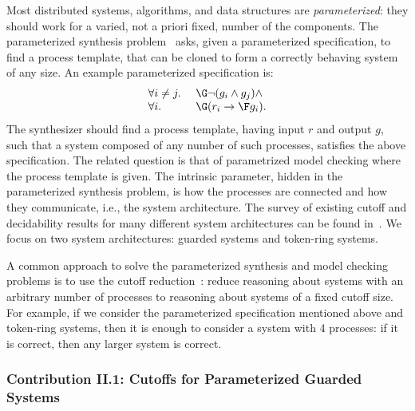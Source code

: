 Most distributed systems, algorithms, and data structures are \emph{parameterized}:
they should work for a varied, not a priori fixed, number of the components.
The parameterized synthesis problem~\cite{JB14} asks, given
a parameterized specification, to find a process template,
that can be cloned to form a correctly behaving system of any size.
An example parameterized specification is:
\[ \begin{array}{ll}
  \forall i \neq j.~ & \G \neg ( g_i \land g_j ) \land \\
  \forall i.~ & \G (r_i \impl \F g_i).
  \end{array}
\]
The synthesizer should find a process template, having input $r$ and output $g$,
such that a system composed of any number of such processes,
satisfies the above specification.
The related question is that of parametrized model checking
where the process template is given.
The intrinsic parameter,
hidden in the parameterized synthesis problem,
is how the processes are connected and how they communicate,
i.e., the system architecture.
The survey of existing cutoff and decidability results
for many different system architectures can be found in~\cite{BloemETAL15}.
We focus on two system architectures: guarded systems and token-ring systems.


A common approach to solve the parameterized synthesis and model checking problems
is to use the cutoff reduction~\cite{Emerso03}:
reduce reasoning about systems with an arbitrary number of processes
to reasoning about systems of a fixed cutoff size.
For example,
if we consider the parameterized specification mentioned above and token-ring systems,
then it is enough to consider a system with 4 processes:
if it is correct, then any larger system is correct.


\subsubsection*{Contribution II.1: Cutoffs for Parameterized Guarded Systems}

